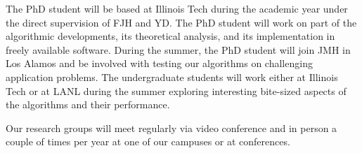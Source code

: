 \documentclass[11pt]{NSFamsart}
\begin{document}
The PhD student will be based at Illinois Tech during the academic year under the direct supervision of FJH and YD.  The PhD student will work on part of the algorithmic developments, its theoretical analysis, and its implementation in freely available software.  During the summer, the PhD student will join JMH in Los Alamos and be involved with testing our algorithms on challenging application problems.  The undergraduate students will work either at Illinois Tech or at LANL during the summer exploring interesting bite-sized aspects of the algorithms and their performance.

Our research groups will meet regularly via video conference and in person a couple of times per year at one of our campuses or at conferences.



\newpage
\clearpage
\setcounter{page}{1}




{\renewcommand\addcontentsline[3]{} 
\renewcommand{\refname}{{\Large\textbf{References Cited}}}                   %
\renewcommand{\bibliofont}{\normalsize}

}
\end{document}
